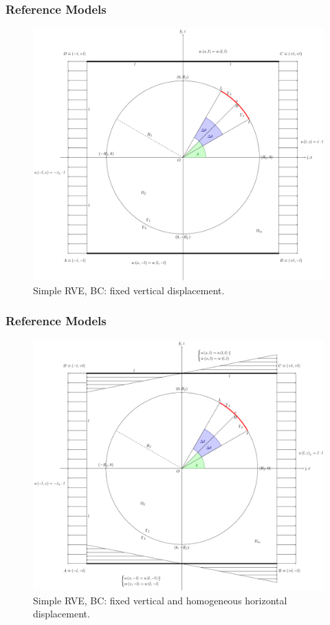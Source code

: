 \documentclass[first,firstsupp,lastsupp,handout,last,hyperref,table]{ETHclass}
\begin{document}
\begin{frame}
\frametitle{Reference Models}
\vspace{-0.25cm}
\centering
\begin{figure}
\centering
\includegraphics[height=0.7\textheight]{LEFM2DsRVEsFsDdepverdispBCULappAxialDispLR.pdf}
\caption{\scriptsize Simple RVE, BC: fixed vertical displacement.}
\label{fig:singleRVE-rigid}
\end{figure}
\end{frame}

\begin{frame}
\frametitle{Reference Models}
\vspace{-0.25cm}
\centering
\begin{figure}
\centering
\includegraphics[height=0.7\textheight]{LEFM2DsRVEsFsDhomoBCULappAxialDispLR.pdf}
\caption{\scriptsize Simple RVE, BC: fixed vertical and homogeneous horizontal displacement.}
\label{fig:singleRVE-homo}
\end{figure}
\end{frame}
\end{document}
